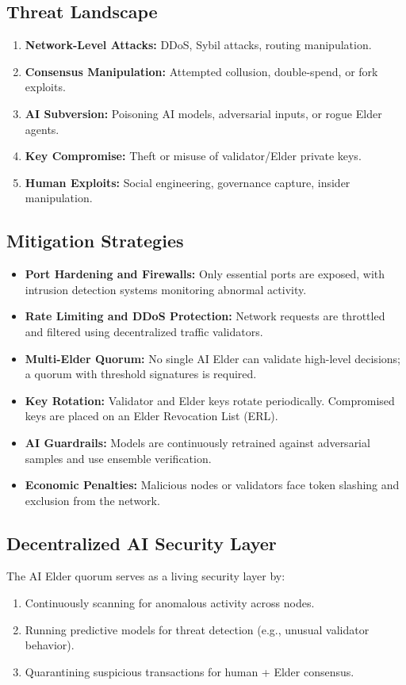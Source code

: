 \documentclass[11pt,a4paper]{article}
\begin{document}
\subsection{Threat Landscape}
\begin{enumerate}
    \item \textbf{Network-Level Attacks:} DDoS, Sybil attacks, routing manipulation.  
    \item \textbf{Consensus Manipulation:} Attempted collusion, double-spend, or fork exploits.  
    \item \textbf{AI Subversion:} Poisoning AI models, adversarial inputs, or rogue Elder agents.  
    \item \textbf{Key Compromise:} Theft or misuse of validator/Elder private keys.  
    \item \textbf{Human Exploits:} Social engineering, governance capture, insider manipulation.  
\end{enumerate}

\subsection{Mitigation Strategies}
\begin{itemize}
    \item \textbf{Port Hardening and Firewalls:} Only essential ports are exposed, with intrusion detection systems monitoring abnormal activity.  
    \item \textbf{Rate Limiting and DDoS Protection:} Network requests are throttled and filtered using decentralized traffic validators.  
    \item \textbf{Multi-Elder Quorum:} No single AI Elder can validate high-level decisions; a quorum with threshold signatures is required.  
    \item \textbf{Key Rotation:} Validator and Elder keys rotate periodically. Compromised keys are placed on an Elder Revocation List (ERL).  
    \item \textbf{AI Guardrails:} Models are continuously retrained against adversarial samples and use ensemble verification.  
    \item \textbf{Economic Penalties:} Malicious nodes or validators face token slashing and exclusion from the network.  
\end{itemize}

\subsection{Decentralized AI Security Layer}
The AI Elder quorum serves as a living security layer by:  
\begin{enumerate}
    \item Continuously scanning for anomalous activity across nodes.  
    \item Running predictive models for threat detection (e.g., unusual validator behavior).  
    \item Quarantining suspicious transactions for human + Elder consensus.  
\end{enumerate}
\end{document}
